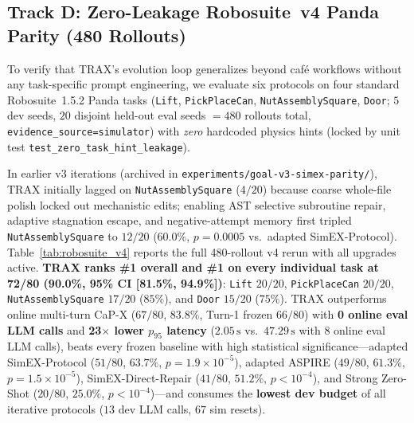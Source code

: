 \documentclass{trax}
\begin{document}
\begin{table}[t]
\centering
\caption{\textsc{CafeBench~v3} shared-arm multi-appliance combo operations ($n{=}12$, \texttt{evidence\_source=simulator}).}
\label{tab:combo_v3}
\small

\end{table}

\subsection{Track D: Zero-Leakage Robosuite~v4 Panda Parity (480 Rollouts)}
To verify that TRAX's evolution loop generalizes beyond caf\'e workflows without any task-specific prompt engineering, we evaluate six protocols on four standard Robosuite~1.5.2 Panda tasks (\texttt{Lift}, \texttt{PickPlaceCan}, \texttt{NutAssemblySquare}, \texttt{Door}; $5$ dev seeds, $20$ disjoint held-out eval seeds $= 480$ rollouts total, \texttt{evidence\_source=simulator}) with \emph{zero} hardcoded physics hints (locked by unit test \texttt{test\_zero\_task\_hint\_leakage}).

In earlier v3 iterations (archived in \texttt{experiments/goal-v3-simex-parity/}), TRAX initially lagged on \texttt{NutAssemblySquare} ($4/20$) because coarse whole-file polish locked out mechanistic edits; enabling AST selective subroutine repair, adaptive stagnation escape, and negative-attempt memory first tripled \texttt{NutAssemblySquare} to $12/20$ ($60.0\%$, $p{=}0.0005$ vs.\ adapted SimEX-Protocol). Table~\ref{tab:robosuite_v4} reports the full 480-rollout v4 rerun with all upgrades active. \textbf{TRAX ranks \#1 overall and \#1 on every individual task at 72/80 (90.0\%, 95\% CI [81.5\%, 94.9\%])}: \texttt{Lift} $20/20$, \texttt{PickPlaceCan} $20/20$, \texttt{NutAssemblySquare} $17/20$ ($85\%$), and \texttt{Door} $15/20$ ($75\%$). TRAX outperforms online multi-turn CaP-X ($67/80$, $83.8\%$, Turn-1 frozen $66/80$) with \textbf{0 online eval LLM calls} and \textbf{23$\times$ lower $p_{95}$ latency} ($2.05\,\mathrm{s}$ vs.\ $47.29\,\mathrm{s}$ with $8$ online eval LLM calls), beats every frozen baseline with high statistical significance---adapted SimEX-Protocol ($51/80$, $63.7\%$, $p{=}1.9{\times}10^{-5}$), adapted ASPIRE ($49/80$, $61.3\%$, $p{=}1.5{\times}10^{-5}$), SimEX-Direct-Repair ($41/80$, $51.2\%$, $p{<}10^{-4}$), and Strong Zero-Shot ($20/80$, $25.0\%$, $p{<}10^{-4}$)---and consumes the \textbf{lowest dev budget} of all iterative protocols ($13$ dev LLM calls, $67$ sim resets).

\begin{table}[t]
\centering
\caption{Zero-Leakage Robosuite~v4 Panda benchmark (4 tasks $\times$ 20 held-out seeds $= 480$ rollouts, \texttt{evidence\_source=simulator}, matched \texttt{gpt-6-astra}). TRAX ranks \#1 overall and \#1 on every task with $0$ online eval LLM calls and the lowest dev budget.}
\label{tab:robosuite_v4}
\small
\resizebox{\linewidth}{!}{}
\end{table}
\end{document}
